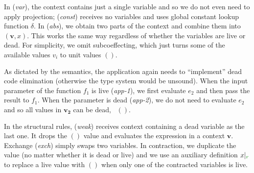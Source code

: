 In (\emph{var}), the context contains just a single variable and so we do not even need to apply
projection; (\emph{const}) receives no variables and uses global constant lookup function $\delta$.
In (\emph{abs}), we obtain two parts of the context and combine them into $(\mathbf{v}, x)$. This
works the same way regardless of whether the variables are live or dead. For simplicity, we omit
subcoeffecting, which just turns some of the available values $v_i$ to unit values $()$.

As dictated by the semantics, the application again needs to ``implement'' dead code elimination
(otherwise the type system would be unsound). When the input parameter of the function $f_1$ is live
(\emph{app-1}), we first evaluate $e_2$ and then pass the result to $f_1$. When the parameter is
dead (\emph{app-2}), we do not need to evaluate $e_2$ and so all values in $\mathbf{v_2}$ can be
dead, \ie~$()$.

In the structural rules, (\emph{weak}) receives context containing a dead variable as the last one.
It drops the $()$ value and evaluates the expression in a context $\mathbf{v}$. Exchange (\emph{exch})
simply swaps two variables. In contraction, we duplicate the value (no matter whether it is dead
or live) and we use an auxiliary definition $\restr{x}{\cclrd{r}}$ to replace a live value with
$()$ when only one of the contracted variables is live.


